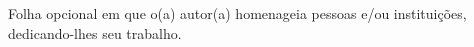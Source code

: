 
\begin{dedicatory}
Folha opcional em que o(a) autor(a) homenageia pessoas e/ou instituições, dedicando-lhes seu trabalho.
\end{dedicatory}
